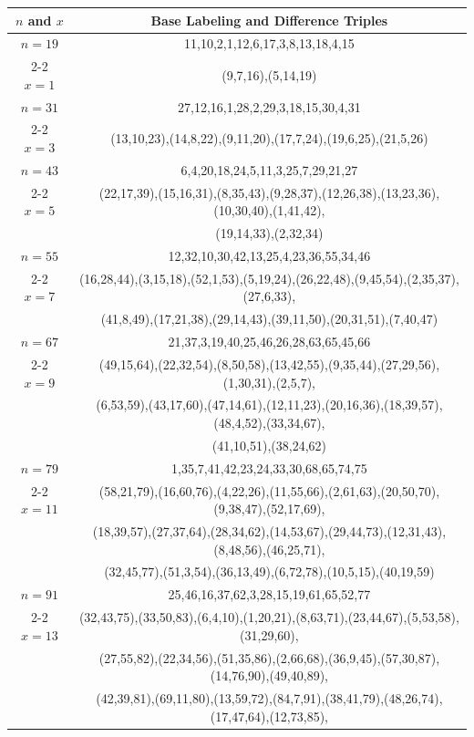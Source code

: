 \begin{tabular}{| c | c |}
\hline
\(n\) and \(x\) & Base Labeling and Difference Triples\\
\hline
\(n=19\) & 
11,10,2,1,12,6,17,3,8,13,18,4,15\\
\cline{2-2}
\(x=1\)
&(9,7,16),(5,14,19)\\
\hline 
\(n=31\) & 
27,12,16,1,28,2,29,3,18,15,30,4,31\\
\cline{2-2}
\(x=3\)
&(13,10,23),(14,8,22),(9,11,20),(17,7,24),(19,6,25),(21,5,26)\\
\hline 
\(n=43\) & 
6,4,20,18,24,5,11,3,25,7,29,21,27\\
\cline{2-2}
\(x=5\)
&(22,17,39),(15,16,31),(8,35,43),(9,28,37),(12,26,38),(13,23,36),(10,30,40),(1,41,42),\\
&(19,14,33),(2,32,34)\\
\hline 
\(n=55\) & 
12,32,10,30,42,13,25,4,23,36,55,34,46\\
\cline{2-2}
\(x=7\)
&(16,28,44),(3,15,18),(52,1,53),(5,19,24),(26,22,48),(9,45,54),(2,35,37),(27,6,33),\\
&(41,8,49),(17,21,38),(29,14,43),(39,11,50),(20,31,51),(7,40,47)\\
\hline 
\(n=67\) & 
21,37,3,19,40,25,46,26,28,63,65,45,66\\
\cline{2-2}
\(x=9\)
&(49,15,64),(22,32,54),(8,50,58),(13,42,55),(9,35,44),(27,29,56),(1,30,31),(2,5,7),\\
&(6,53,59),(43,17,60),(47,14,61),(12,11,23),(20,16,36),(18,39,57),(48,4,52),(33,34,67),\\
&(41,10,51),(38,24,62)\\
\hline 
\(n=79\) & 
1,35,7,41,42,23,24,33,30,68,65,74,75\\
\cline{2-2}
\(x=11\)
&(58,21,79),(16,60,76),(4,22,26),(11,55,66),(2,61,63),(20,50,70),(9,38,47),(52,17,69),\\
&(18,39,57),(27,37,64),(28,34,62),(14,53,67),(29,44,73),(12,31,43),(8,48,56),(46,25,71),\\
&(32,45,77),(51,3,54),(36,13,49),(6,72,78),(10,5,15),(40,19,59)\\
\hline 
\(n=91\) & 
25,46,16,37,62,3,28,15,19,61,65,52,77\\
\cline{2-2}
\(x=13\)
&(32,43,75),(33,50,83),(6,4,10),(1,20,21),(8,63,71),(23,44,67),(5,53,58),(31,29,60),\\
&(27,55,82),(22,34,56),(51,35,86),(2,66,68),(36,9,45),(57,30,87),(14,76,90),(49,40,89),\\
&(42,39,81),(69,11,80),(13,59,72),(84,7,91),(38,41,79),(48,26,74),(17,47,64),(12,73,85),\\

\end{tabular}
